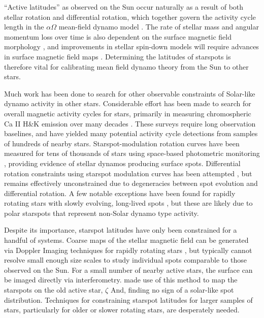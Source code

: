 \documentclass[preprint2]{aastex61}
\begin{document}
``Active latitudes'' as observed on the Sun occur naturally as a result of both stellar rotation and differential rotation, which together govern the activity cycle length in the $\alpha\Omega$ mean-field dynamo model \citep{brandenburg2005}. The rate of stellar mass and angular momentum loss over time is also dependent on the surface magnetic field morphology \citep{garraffo2015}, and improvements in stellar spin-down models will require advances in surface magnetic field maps \citep{garraffo2016}.
Determining the latitudes of starspots is therefore vital for calibrating mean field dynamo theory from the Sun to other stars.


Much work has been done to search for other observable constraints of Solar-like dynamo activity in other stars.
Considerable effort has been made to search for overall magnetic activity cycles for stars, primarily in measuring chromospheric Ca II H\&K emission over many decades \citep[e.g.]{wilson1978,baliunas1995}. These surveys require long observation baselines, and have yielded many potential activity cycle detections from samples of hundreds of nearby stars. Starspot-modulation rotation curves have been measured for tens of thousands of stars using space-based photometric monitoring \citep{mcquillan2014}, providing evidence of stellar dynamos producing surface spots. Differential rotation constraints using starspot modulation curves has been attempted \citep[e.g.][]{reinhold2013}, but remains effectively unconstrained due to degeneracies between spot evolution and differential rotation\citep{aigrain2015}. A few notable exceptions have been found for rapidly rotating stars with slowly evolving, long-lived spots \citep[e.g.][]{morin2008a,davenport2015b}, but these are likely due to polar starspots that represent non-Solar dynamo type activity. 


Despite its importance, starspot latitudes have only been constrained for a handful of systems. %
Coarse maps of the stellar magnetic field can be generated via Doppler Imaging techniques for rapidly rotating stars \citep{semel1989,donati_brown1997}, but typically cannot resolve small enough size scales to study individual spots comparable to those observed on the Sun.
For a small number of nearby active stars, the surface can be imaged directly via interferometry. \cite{roettenbacher2016} made use of this method to map the starspots on the old active star, $\zeta$ And, finding no sign of a solar-like spot distribution. Techniques for constraining starspot latitudes for larger samples of stars, particularly for older or slower rotating stars, are desperately needed.
\end{document}
